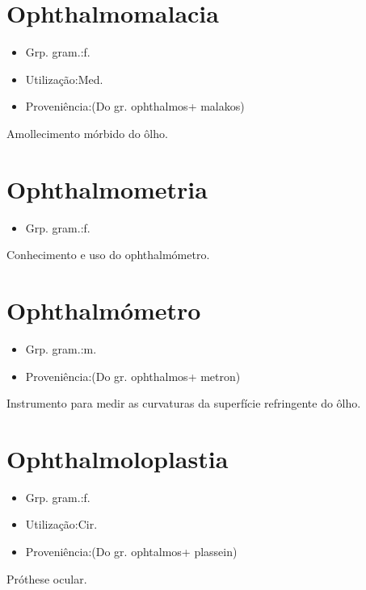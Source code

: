 \section{Ophthalmomalacia}
\begin{itemize}
\item {Grp. gram.:f.}
\end{itemize}
\begin{itemize}
\item {Utilização:Med.}
\end{itemize}
\begin{itemize}
\item {Proveniência:(Do gr. \textunderscore ophthalmos\textunderscore  + \textunderscore malakos\textunderscore )}
\end{itemize}
Amollecimento mórbido do ôlho.
\section{Ophthalmometria}
\begin{itemize}
\item {Grp. gram.:f.}
\end{itemize}
Conhecimento e uso do ophthalmómetro.
\section{Ophthalmómetro}
\begin{itemize}
\item {Grp. gram.:m.}
\end{itemize}
\begin{itemize}
\item {Proveniência:(Do gr. \textunderscore ophthalmos\textunderscore  + \textunderscore metron\textunderscore )}
\end{itemize}
Instrumento para medir as curvaturas da superfície refringente do ôlho.
\section{Ophthalmoloplastia}
\begin{itemize}
\item {Grp. gram.:f.}
\end{itemize}
\begin{itemize}
\item {Utilização:Cir.}
\end{itemize}
\begin{itemize}
\item {Proveniência:(Do gr. \textunderscore ophtalmos\textunderscore  + \textunderscore plassein\textunderscore )}
\end{itemize}
Próthese ocular.
